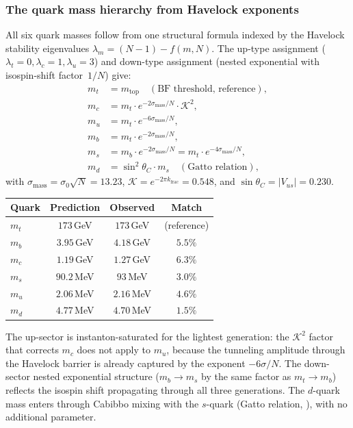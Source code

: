 \subsubsection{The quark mass hierarchy from Havelock exponents}
\label{sec:mass-formulas}
All six quark masses follow from one structural formula
indexed by the Havelock stability eigenvalues
$\lambda_m = (N{-}1) - f(m,N)$.
The up-type assignment ($\lambda_t = 0, \lambda_c = 1, \lambda_u = 3$)
and down-type assignment (nested exponential with
isospin-shift factor~$1/N$) give:
\begin{align}
m_t &= m_{\mathrm{top}} \quad (\text{BF threshold, reference}),\\
m_c &= m_t \cdot e^{-2\sigma_{\mathrm{mass}}/N}\cdot\mathcal{K}^2,
  \label{eq:mass-c}\\
m_u &= m_t \cdot e^{-6\sigma_{\mathrm{mass}}/N},
  \label{eq:mass-u}\\
m_b &= m_t \cdot e^{-2\sigma_{\mathrm{mass}}/N},
  \label{eq:mass-b}\\
m_s &= m_b \cdot e^{-2\sigma_{\mathrm{mass}}/N}
     = m_t \cdot e^{-4\sigma_{\mathrm{mass}}/N},
  \label{eq:mass-s}\\
m_d &= \sin^2\theta_C \cdot m_s
  \quad (\text{Gatto relation}),
  \label{eq:mass-d}
\end{align}
with $\sigma_{\mathrm{mass}} = \sigma_0\sqrt{N} = 13.23$,
$\mathcal{K} = e^{-2\pi k_{\mathrm{frac}}} = 0.548$,
and $\sin\theta_C = |V_{us}| = 0.230$.
\begin{center}\small
\begin{tabular}{lccc}
\toprule
Quark & Prediction & Observed & Match \\
\midrule
$m_t$ & $173$\,GeV & $173$\,GeV & (reference) \\
$m_b$ & $3.95$\,GeV & $4.18$\,GeV & $5.5\%$ \\
$m_c$ & $1.19$\,GeV & $1.27$\,GeV & $6.3\%$ \\
$m_s$ & $90.2$\,MeV & $93$\,MeV & $3.0\%$ \\
$m_u$ & $2.06$\,MeV & $2.16$\,MeV & $4.6\%$ \\
$m_d$ & $4.77$\,MeV & $4.70$\,MeV & $1.5\%$ \\
\bottomrule
\end{tabular}
\end{center}
\noindent
The up-sector is instanton-saturated for the lightest
generation: the $\mathcal{K}^2$ factor that corrects $m_c$
does not apply to $m_u$, because the tunneling amplitude
through the Havelock barrier is already captured by the
exponent $-6\sigma/N$.
The down-sector nested exponential structure
($m_b \to m_s$ by the same factor as $m_t \to m_b$)
reflects the isospin shift propagating through all three
generations.
The $d$-quark mass enters through Cabibbo mixing with
the $s$-quark (Gatto relation, \citealt{Gatto1968}),
with no additional parameter.

